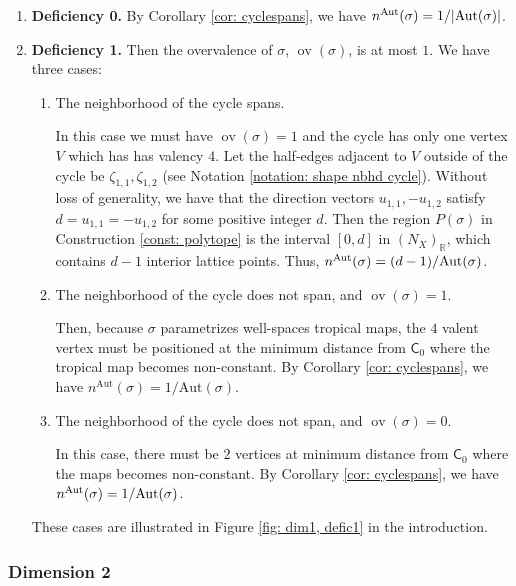 \documentclass{article}
\def\Aut{{\rm Aut}}
\newcommand{\tropC}{\mathsf{C}}
\newcommand{\ov}[1]{\operatorname{ov}(#1)}
\newcommand{\nn}{n^{\operatorname{Aut}}}
\begin{document}
\begin{enumerate}

\item \textbf{Deficiency 0.}  By Corollary \ref{cor: cyclespans}, we have $\nn(\sigma) = 1/|\Aut(\sigma)|$. 

\item \textbf{Deficiency 1.} Then the overvalence of $\sigma$, $\ov{\sigma}$, is at most $1$. We have three cases:
    \begin{enumerate}
        \item The neighborhood of the cycle spans. 
        
        In this case we must have $\ov{\sigma} = 1$ and the cycle has only one vertex $V$ which has has valency $4$. Let the half-edges adjacent to $V$ outside of the cycle be $\zeta_{1,1}, \zeta_{1,2}$ (see Notation \ref{notation: shape nbhd cycle}). Without loss of generality, we have that the direction vectors $u_{1,1}, - u_{1,2}$ satisfy $d = u_{1,1} = -u_{1,2}$ for some positive integer $d$. Then the region $P(\sigma)$ in Construction \ref{const: polytope} is the interval $[0,d]$ in $(N_X)_{\mathbb{R}}$, which contains $d-1$ interior lattice points. Thus, $\nn(\sigma) = (d-1)/ \Aut(\sigma)$. 
        \item The neighborhood of the cycle does not span, and $\ov{\sigma} = 1$.

        Then, because $\sigma$ parametrizes well-spaces tropical maps, the $4$ valent vertex must be positioned at the minimum distance from $\tropC_0$ where the tropical map becomes non-constant. By Corollary \ref{cor: cyclespans}, we have $\nn(\sigma)=1/\mathrm{Aut}(\sigma)$.

        
        \item The neighborhood of the cycle does not span, and $\ov{\sigma} = 0$.

        In this case, there must be $2$ vertices at minimum distance from $\tropC_0$ where the maps becomes non-constant. By Corollary \ref{cor: cyclespans}, we have $\nn(\sigma) = 1/\Aut(\sigma)$.
    \end{enumerate}
These cases are illustrated in Figure \ref{fig: dim1, defic1} in the introduction.

\end{enumerate}




\subsubsection{Dimension 2}
\end{document}
